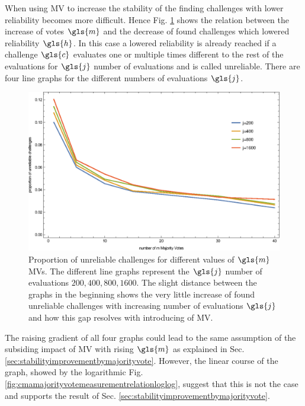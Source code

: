 When using \ac{MV} to increase the stability of the \apuf finding challenges with lower reliability becomes more difficult.
Hence Fig. \ref{fig:cmamajorityvotemeasurementrelation} shows the relation between the increase of votes $\gls{m}$ and the decrease of found challenges which lowered reliability $\gls{h}$.
In this case a lowered reliability is already reached if a challenge $\gls{c}$ evaluates one or multiple times different to the rest of the evaluations for $\gls{j}$ number of evaluations and is called unreliable. %
There are four line graphs for the different numbers of evaluations $\gls{j}$.

\begin{figure}[ht]
\includegraphics[width=1.00\textwidth]{images/mv-measurements-unstableChallenges.eps}
\caption[Proportion of unreliable challenges]{Proportion of unreliable challenges for different values of $\gls{m}$ \acp{MV}. The different line graphs represent the $\gls{j}$ number of evaluations $200, 400, 800, 1600$. The slight distance between the graphs in the beginning shows the very little increase of found unreliable challenges with increasing number of evaluations $\gls{j}$ and how this gap resolves with introducing of \ac{MV}.}
\label{fig:cmamajorityvotemeasurementrelation}
\end{figure}

The raising gradient of all four graphs could lead to the same assumption of the subsiding impact of \ac{MV} with rising $\gls{m}$ as explained in Sec. \ref{sec:stabilityimprovementbymajorityvote}.
However, the linear course of the graph, showed by the logarithmic Fig. \ref{fig:cmamajorityvotemeasurementrelationloglog}, suggest that this is not the case and supports the result of Sec. \ref{sec:stabilityimprovementbymajorityvote}.

